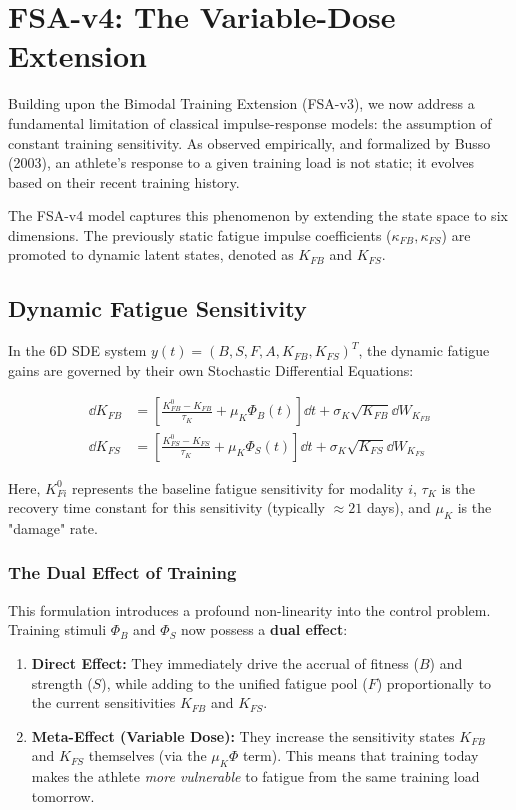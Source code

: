 \section{FSA-v4: The Variable-Dose Extension} \label{sec:fsa-v4}

Building upon the Bimodal Training Extension (FSA-v3), we now address a fundamental limitation of classical impulse-response models: the assumption of constant training sensitivity. As observed empirically, and formalized by Busso (2003), an athlete's response to a given training load is not static; it evolves based on their recent training history.

The FSA-v4 model captures this phenomenon by extending the state space to six dimensions. The previously static fatigue impulse coefficients ($\kappa_{FB}, \kappa_{FS}$) are promoted to dynamic latent states, denoted as $K_{FB}$ and $K_{FS}$.

\subsection{Dynamic Fatigue Sensitivity}

In the 6D SDE system $y(t) = (B, S, F, A, K_{FB}, K_{FS})^T$, the dynamic fatigue gains are governed by their own Stochastic Differential Equations:

\begin{align}
  \dd K_{FB} &= \left[ \frac{K_{FB}^0 - K_{FB}}{\tau_K} + \mu_K \Phi_B(t) \right] \dd t + \sigma_K \sqrt{K_{FB}} \dd W_{K_{FB}} \\
  \dd K_{FS} &= \left[ \frac{K_{FS}^0 - K_{FS}}{\tau_K} + \mu_K \Phi_S(t) \right] \dd t + \sigma_K \sqrt{K_{FS}} \dd W_{K_{FS}}
\end{align}

Here, $K_{Fi}^0$ represents the baseline fatigue sensitivity for modality $i$, $\tau_K$ is the recovery time constant for this sensitivity (typically $\approx 21$ days), and $\mu_K$ is the "damage" rate. 

\subsubsection{The Dual Effect of Training}
This formulation introduces a profound non-linearity into the control problem. Training stimuli $\Phi_B$ and $\Phi_S$ now possess a \textbf{dual effect}:
\begin{enumerate}
    \item \textbf{Direct Effect:} They immediately drive the accrual of fitness ($B$) and strength ($S$), while adding to the unified fatigue pool ($F$) proportionally to the current sensitivities $K_{FB}$ and $K_{FS}$.
    \item \textbf{Meta-Effect (Variable Dose):} They increase the sensitivity states $K_{FB}$ and $K_{FS}$ themselves (via the $\mu_K \Phi$ term). This means that training today makes the athlete \textit{more vulnerable} to fatigue from the same training load tomorrow.
\end{enumerate}


